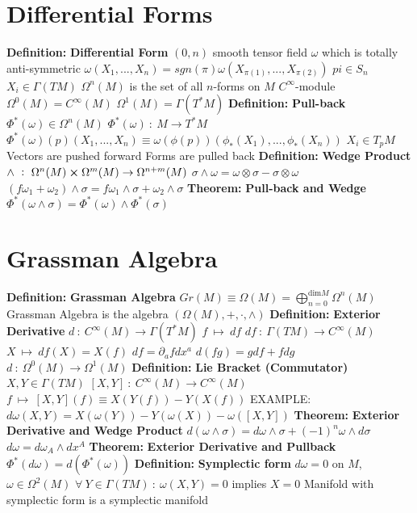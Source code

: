\documentclass[14pt]{extarticle}
\def\Definition{{\color{blue} \textbf{Definition:} }}
\def\Theorem{{\color{red} \textbf{Theorem:} }}
\begin{document}
\begin{outline}
	\section*{Differential Forms}
		\1	\Definition \textbf{Differential Form}
			\2	$(0,n)$ smooth tensor field $\omega$ which is totally anti-symmetric
			\2	$\omega(X_1,...,X_n) = sgn(\pi) \omega(X_{\pi(1)},...,X_{\pi(2)})$
				\3	$pi \in S_n$
				\3	$X_i \in \Gamma(TM)$
			\2	$\Omega^n(M)$ is the set of all $n$-forms on $M$
				\3	$C^{\infty}$-module
				\3	$\Omega^0(M) = C^{\infty}(M)$
				\3	$\Omega^1(M) = \Gamma(T^*M)$
		\1	\Definition \textbf{Pull-back}
			\2	$\Phi^*(\omega) \in \Omega^n(M)$
			\2	$\Phi^*(\omega)~:~M \rightarrow T^*M$
			\2	$\Phi^*(\omega)(p)(X_1,...,X_n) \equiv \omega(\phi(p))(\phi_*(X_1),...,\phi_*(X_n))$
				\3	$X_i \in T_pM$
			\2	Vectors are pushed forward
			\2	Forms are pulled back
		\1	\Definition \textbf{Wedge Product}
			\2	$\wedge~:~\Omega^n(M) \cross \Omega^m(M) \rightarrow \Omega^{n+m}(M)$
			\2	$\sigma \wedge \omega = \omega \otimes \sigma - \sigma \otimes \omega$
			\2	$(f\omega_1 + \omega_2) \wedge \sigma = f \omega_1 \wedge \sigma + \omega_2 \wedge \sigma$
		\1	\Theorem \textbf{Pull-back and Wedge}
			\2	$\Phi^*(\omega \wedge \sigma) = \Phi^*(\omega) \wedge \Phi^*(\sigma)$
	
	\section*{Grassman Algebra}
		\1	\Definition \textbf{Grassman Algebra}
			\2	$Gr(M) \equiv \Omega(M) = \bigoplus_{n=0}^{\text{dim}M} \Omega^n(M)$
			\2	Grassman Algebra is the algebra $(\Omega(M),+,\cdot,\wedge)$
		\1	\Definition \textbf{Exterior Derivative}
			\2	$d~:~C^{\infty}(M) \rightarrow \Gamma(T^*M)$
			\2	$f~\mapsto~df$
			\2	$df~:~\Gamma(TM) \rightarrow C^{\infty}(M)$
			\2	$X~\mapsto~df(X) = X(f)$
			\2	$df = \partial_a f dx^a$
			\2	$d(fg) = gdf + fdg$
			\2	$d~:~\Omega^0(M) \rightarrow \Omega^1(M)$
		\1	\Definition \textbf{Lie Bracket (Commutator)}
			\2	$X,Y \in \Gamma(TM)$
			\2	$[X,Y]~:~C^{\infty}(M) \rightarrow C^{\infty}(M)$
			\2	$f~\mapsto~[X,Y](f) \equiv X(Y(f)) - Y(X(f))$
			\2	EXAMPLE:
				\3	$d\omega (X,Y) = X(\omega(Y)) - Y(\omega(X)) - \omega([X,Y])$
		\1	\Theorem \textbf{Exterior Derivative and Wedge Product}
			\2	$d(\omega \wedge \sigma) = d\omega \wedge \sigma + (-1)^n \omega \wedge d\sigma$
			\2	$d\omega = d\omega_A \wedge dx^A$
		\1	\Theorem \textbf{Exterior Derivative and Pullback}
			\2	$\Phi^*(d\omega) = d(\Phi^*(\omega))$
		\1	\Definition \textbf{Symplectic form}
			\2	$d\omega = 0$ on $M$, $\omega \in \Omega^2(M)$
			\2	$\forall~Y \in \Gamma(TM)~:~\omega(X,Y) = 0$ implies $X = 0$
			\2	Manifold with symplectic form is a symplectic manifold
	

\end{outline}
\end{document}
